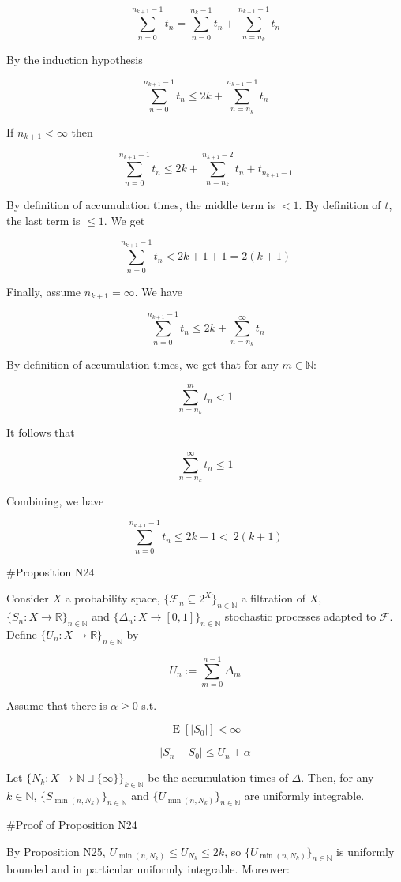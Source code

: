 \documentclass[a4paper]{article}
\DeclareMathOperator{\E}{E}
\newcommand{\Nats}{\mathbb{N}}
\newcommand{\Reals}{\mathbb{R}}
\newcommand{\Sq}[2]{\{#1\}_{#2 \in \Nats}}
\newcommand{\Sqn}[1]{\Sq{#1}{n}}
\newcommand{\Abs}[1]{\lvert #1 \rvert}
\newcommand{\F}{\mathcal{F}}
\begin{document}
$$\sum_{n = 0}^{n_{k+1} - 1} t_n = \sum_{n = 0}^{n_k - 1} t_n + \sum_{n = n_k}^{n_{k+1} - 1} t_n$$

By the induction hypothesis

$$\sum_{n = 0}^{n_{k+1} - 1} t_n \leq 2k + \sum_{n = n_k}^{n_{k+1} - 1} t_n$$

If ${n_{k+1} < \infty}$ then

$$\sum_{n = 0}^{n_{k+1} - 1} t_n \leq 2k + \sum_{n = n_k}^{n_{k+1} - 2} t_n + t_{n_{k+1}-1}$$

By definition of accumulation times, the middle term is ${< 1}$. By definition of ${t}$, the last term is ${\leq 1}$. We get

$$\sum_{n = 0}^{n_{k+1} - 1} t_n < 2k + 1 + 1 = 2(k+1)$$

Finally, assume ${n_{k+1} = \infty}$. We have

$$\sum_{n = 0}^{n_{k+1} - 1} t_n \leq 2k + \sum_{n = n_k}^{\infty} t_n$$

By definition of accumulation times, we get that for any ${m \in \Nats}$:

$$\sum_{n = n_k}^{m} t_n < 1$$

It follows that

$$\sum_{n = n_k}^{\infty} t_n \leq 1$$

Combining, we have

$$\sum_{n = 0}^{n_{k+1} - 1} t_n \leq 2k+1 <\ 2(k+1)$$

\#Proposition N24

Consider ${X}$ a probability space, ${\{\F_n \subseteq 2^X\}_{n \in \Nats}}$ a filtration of ${X}$, ${\{S_n:X \rightarrow \Reals\}_{n \in \Nats}}$ and ${\{\Delta_n:X \rightarrow [0,1]\}_{n \in \Nats}}$ stochastic processes adapted to ${\F}$. Define ${\Sqn{U_n: X \rightarrow \Reals}}$ by

$$U_n := \sum_{m=0}^{n-1} \Delta_m$$

Assume that there is ${\alpha \geq 0}$ s.t.

$$\E[\Abs{S_0}] < \infty$$

$$\Abs{S_{n}-S_0} \leq U_n + \alpha$$

Let ${\{N_k: X \rightarrow \Nats \sqcup \{\infty\}\}_{k \in \Nats}}$ be the accumulation times of ${\Delta}$. Then, for any ${k \in \Nats}$, ${\Sqn{S_{\min(n,N_k)}}}$ and ${\Sqn{U_{\min(n,N_k)}}}$ are uniformly integrable.

\#Proof of Proposition N24

By Proposition N25, $U_{\min(n,N_k)} \leq U_{N_k} \leq 2k$, so ${\Sqn{U_{\min(n,N_k)}}}$ is uniformly bounded and in particular uniformly integrable. Moreover:
\end{document}
